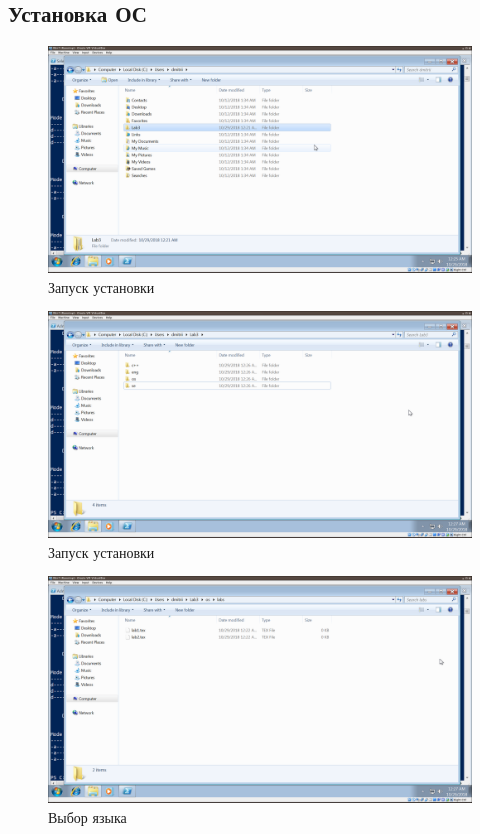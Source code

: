 \documentclass[a4paper]{article}
\begin{document}
\subsection{Установка ОС}
\begin{figure}[H]
    \centering
    \includegraphics[width=\linewidth]{5.png}
    \caption{Запуск установки}
\end{figure}

\begin{figure}[H]
    \centering
    \includegraphics[width=\linewidth]{6.png}
    \caption{Запуск установки}
\end{figure}

\begin{figure}[H]
    \centering
    \includegraphics[width=\linewidth]{7.png}
    \caption{Выбор языка}
\end{figure}
\end{document}
